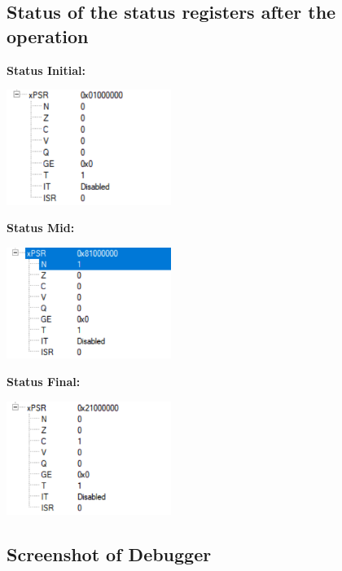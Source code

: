 \documentclass{article}
\begin{document}
\subsection{Status of the status registers after the operation}

\textbf{Status Initial: }\newline\newline

\begin{center}
    \includegraphics[width=0.4\textwidth]{Status_Initial.png}
\end{center}

\textbf{Status Mid: }\newline\newline

\begin{center}
    \includegraphics[width=0.4\textwidth]{Status_Mid.png}
\end{center}

\textbf{Status Final: }\newline\newline

\begin{center}
    \includegraphics[width=0.4\textwidth]{Status_Final.png}
\end{center}

\subsection{Screenshot of Debugger}
\end{document}

